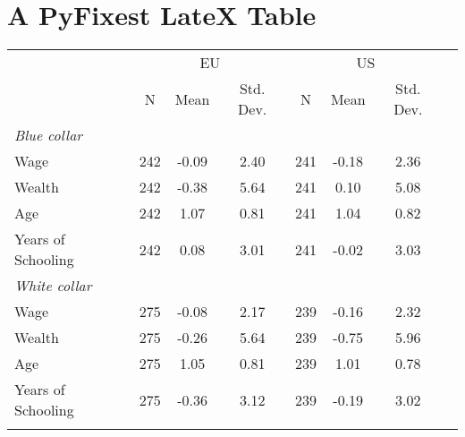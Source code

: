 \documentclass{article}%
\begin{document}
%
\normalsize%
\section{A PyFixest LateX Table}%
\label{sec:APyFixestLateXTable}%


\begin{table}[htbp]%
\renewcommand\cellalign{t}
\begin{threeparttable}
\begin{tabular}{lccccccc}
\toprule
 & \multicolumn{3}{c}{EU} & \multicolumn{3}{c}{US} \\
\cmidrule(lr){2-4} \cmidrule(lr){5-7}
 & N & Mean & Std. Dev. & N & Mean & Std. Dev. \\
\midrule
\addlinespace
\emph{Blue collar} \\
\addlinespace
Wage & 242 & -0.09 & 2.40 & 241 & -0.18 & 2.36 \\
Wealth & 242 & -0.38 & 5.64 & 241 & 0.10 & 5.08 \\
Age & 242 & 1.07 & 0.81 & 241 & 1.04 & 0.82 \\
Years of Schooling & 242 & 0.08 & 3.01 & 241 & -0.02 & 3.03 \\
\addlinespace
\midrule
\addlinespace
\emph{White collar} \\
\addlinespace
Wage & 275 & -0.08 & 2.17 & 239 & -0.16 & 2.32 \\
Wealth & 275 & -0.26 & 5.64 & 239 & -0.75 & 5.96 \\
Age & 275 & 1.05 & 0.81 & 239 & 1.01 & 0.78 \\
Years of Schooling & 275 & -0.36 & 3.12 & 239 & -0.19 & 3.02 \\
\addlinespace
\bottomrule
\end{tabular}
\footnotesize
\end{threeparttable}%
\end{table}

%
\end{document}
